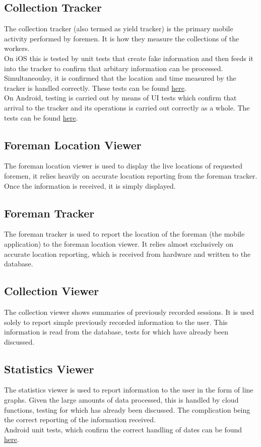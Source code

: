\documentclass[12pt]{article}
\begin{document}
\subsection{Collection Tracker}
The collection tracker (also termed as yield tracker) is the primary mobile activity performed by foremen. It is how they measure the collections of the workers.\\
\indent On iOS this is tested by unit tests that create fake information and then feeds it into the tracker to confirm that arbitary information can be processed. Simultaneoulsy, it is confirmed that the location and time measured by the tracker is handled correctly. These tests can be found \href{https://github.com/BinaryNinjaz/COS301-Capstone/blob/iOS-/Source/master/Harvest/HarvestTests/HarvestTests.swift}{here}.\\
\indent On Android, testing is carried out by means of UI tests which confirm that arrival to the tracker and its operations is carried out correctly as a whole. The tests can be found \href{https://github.com/BinaryNinjaz/COS301-Capstone/blob/master/Source/Android/Harvest/app/src/androidTest/java/za/org/samac/harvest/YieldTrackerTest.java}{here}.
\subsection{Foreman Location Viewer}
The foreman location viewer is used to display the live locations of requested foremen, it relies heavily on accurate location reporting from the foreman tracker. Once the information is received, it is simply displayed.
\subsection{Foreman Tracker}
The foreman tracker is used to report the location of the foreman (the mobile application) to the foreman location viewer. It relies almost exclusively on accurate location reporting, which is received from hardware and written to the database.
\subsection{Collection Viewer}
The collection viewer shows summaries of previously recorded sessions. It is used solely to report simple previously recorded information to the user. This information is read from the database, tests for which have already been discussed.
\subsection{Statistics Viewer}
The statistics viewer is used to report information to the user in the form of line graphs. Given the large amounts of data processed, this is handled by cloud functions, testing for which has already been discussed. The complication being the correct reporting of the information received.\\
\indent Android unit tests, which confirm the correct handling of dates can be found \href{https://github.com/BinaryNinjaz/COS301-Capstone/blob/Android/Source/master/Harvest/app/src/test/java/za/org/samac/harvest/StatsTests.java}{here}.
\end{document}
